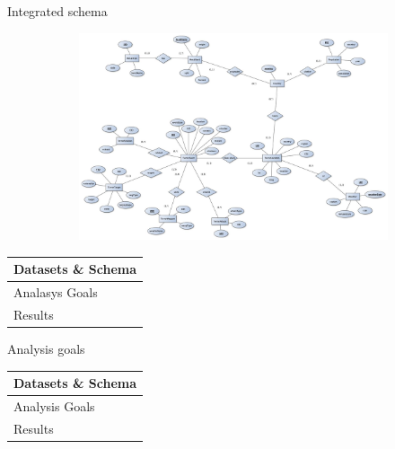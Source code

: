 \documentclass{beamer}
\begin{document}
\begin{frame}{Integrated schema}
	\begin{figure}
		\begin{subfigure}[b]{\textwidth}
			\includegraphics[width=\textwidth]{ER/g2-integratedSchema.jpg}
		\end{subfigure}
	\end{figure}
\end{frame}


\begin{frame}
	\begin{tabularx}{\textwidth}{X}
		\hline
		Datasets \& Schema\\
		\hline
		\rowcolor{hcolor}
		Analasys Goals\\
		\hline
		Results\\
		\hline
	\end{tabularx}
\end{frame}


\begin{frame}{Analysis goals}
	
\end{frame}


\begin{frame}
	\begin{tabularx}{\textwidth}{X}
		\hline
		Datasets \& Schema\\
		\hline
		Analysis Goals\\
		\hline
		\rowcolor{hcolor}
		Results\\
		\hline
	\end{tabularx}
\end{frame}
\end{document}
